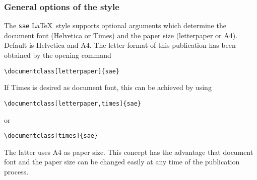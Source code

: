 \documentclass[letterpaper]{sae}
\begin{document}
\subsubsection{General options of the style}
The \texttt{sae} \LaTeX\ style supports optional arguments which determine the
document font (Helvetica or Times) and the paper size (letterpaper or
A4). Default is Helvetica and A4. The letter format of this publication has
been obtained by the opening command
\begin{verbatim}
\documentclass[letterpaper]{sae}
\end{verbatim}
If Times is desired as document font, this can be achieved by using
\begin{verbatim}
\documentclass[letterpaper,times]{sae}
\end{verbatim}
or
\begin{verbatim}
\documentclass[times]{sae}
\end{verbatim}
The latter uses A4 as paper size. This concept has the advantage that document
font and the paper size can be changed easily at any time of the publication
process. 
\end{document}
